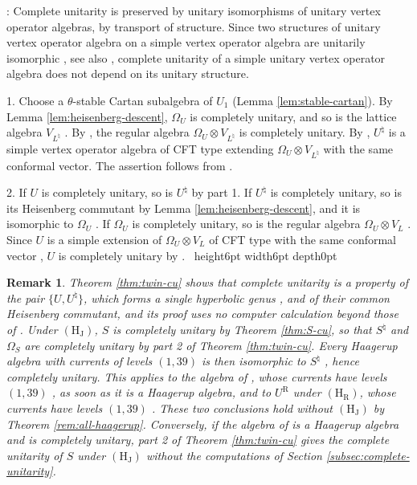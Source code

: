 \documentclass[leqno]{article}
\newcommand{\qed}{\hfill \vrule height6pt  width6pt depth0pt}
\newcommand{\ot}{\otimes}
\newtheorem{remark}[thm]{Remark}
\newenvironment{proof}[1][]{\noindent {\it Proof #1} : }{\hbox{~}\qed
\smallskip
}
\numberwithin{equation}{section}
\begin{document}
\begin{proof}
Complete unitarity is preserved by unitary isomorphisms of unitary vertex operator algebras, by transport of structure. Since two structures of unitary vertex operator algebra on a simple vertex operator algebra are unitarily isomorphic \cite[Proposition 5.19 p.~40 and p.~41]{CKLW18}, see also \cite[Remark 4.4 p.~18]{CGGH23}, complete unitarity of a simple unitary vertex operator algebra does not depend on its unitary structure.

1. Choose a $\theta$-stable Cartan subalgebra of $U_1$ (Lemma \ref{lem:stable-cartan}). By Lemma \ref{lem:heisenberg-descent}, $\Omega_U$ is completely unitary, and so is the lattice algebra $V_{L^\natural}$ \cite[Corollary 3.32 p.~49]{Gui22}. By \cite[Proposition 3.31 p.~48]{Gui22}, the regular algebra $\Omega_U \ot V_{L^\natural}$ is completely unitary. By \cite[Theorem 12.3, part 1]{Arh26}, $U^\natural$ is a simple vertex operator algebra of CFT type extending $\Omega_U \ot V_{L^\natural}$ with the same conformal vector. The assertion follows from \cite[Theorem 4.7 p.~19]{CGGH23}.

2. If $U$ is completely unitary, so is $U^\natural$ by part 1. If $U^\natural$ is completely unitary, so is its Heisenberg commutant by Lemma \ref{lem:heisenberg-descent}, and it is isomorphic to $\Omega_U$ \cite[Theorem 12.3(1)]{Arh26}. If $\Omega_U$ is completely unitary, so is the regular algebra $\Omega_U \ot V_L$ \cite[Proposition 3.31 p.~48 and Corollary 3.32 p.~49]{Gui22}. Since $U$ is a simple extension of $\Omega_U \ot V_L$ of CFT type with the same conformal vector \cite[Proposition 12.2, part 1]{Arh26}, $U$ is completely unitary by \cite[Theorem 4.7 p.~19]{CGGH23}.
\end{proof}

\begin{remark}\normalfont
\label{rem:twin-cu}
Theorem \ref{thm:twin-cu} shows that complete unitarity is a property of the pair $\{U,U^\natural\}$, which forms a single hyperbolic genus \cite[Theorem 12.3, part 4]{Arh26}, and of their common Heisenberg commutant, and its proof uses no computer calculation beyond those of \cite[Theorem 8.5 and Section 12]{Arh26}. Under $\mathrm{(H_J)}$, $S$ is completely unitary by Theorem \ref{thm:S-cu}, so that $S^\natural$ and $\Omega_S$ are completely unitary by part 2 of Theorem \ref{thm:twin-cu}. Every Haagerup algebra with currents of levels $(1,39)$ is then isomorphic to $S^\natural$ \cite[Theorem 12.4, part 1]{Arh26}, hence completely unitary. This applies to the algebra of \cite{Hua26}, whose currents have levels $(1,39)$ \cite[Abstract p.~1 and Section 3 p.~3]{Hua26}, as soon as it is a Haagerup algebra, and to $U^{\mathrm R}$ under $\mathrm{(H_R)}$, whose currents have levels $(1,39)$ \cite[Proposition 10.36]{Arh26}. These two conclusions hold without $\mathrm{(H_J)}$ by Theorem \ref{rem:all-haagerup}. Conversely, if the algebra of \cite{Hua26} is a Haagerup algebra and is completely unitary, part 2 of Theorem \ref{thm:twin-cu} gives the complete unitarity of $S$ under $\mathrm{(H_J)}$ without the computations of Section \ref{subsec:complete-unitarity}.
\end{remark}
\end{document}

